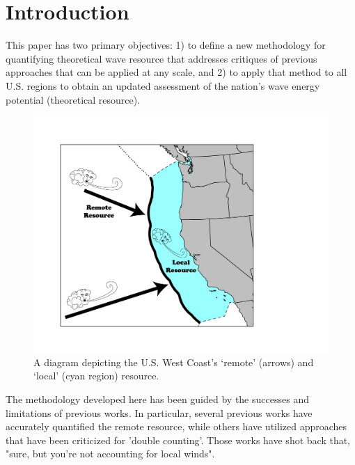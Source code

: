 \section{Introduction}


This paper has two primary objectives: 1) to define a new methodology for quantifying theoretical wave resource that addresses critiques of previous approaches that can be applied at any scale, and 2) to apply that method to all U.S. regions to obtain an updated assessment of the nation's wave energy potential (theoretical resource).




\begin{figure}[ht]
  \centering
  \includegraphics[width=0.9\linewidth]{../diagram/EEZ_contour03_edit01.png}
  \caption{A diagram depicting the U.S. West Coast’s ‘remote’ (arrows) and ‘local’ (cyan region) resource.}
  \label{fig:diagram:west-eez}
\end{figure}

The methodology developed here has been guided by the successes and limitations of previous works. In particular, several previous works have accurately quantified the remote resource, while others have utilized approaches that have been criticized for 'double counting'. Those works have shot back that, "sure, but you're not accounting for local winds".



